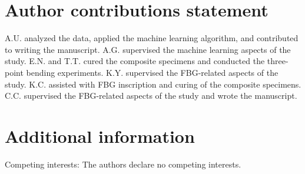 \documentclass[fleqn,10pt]{wlscirep}
\begin{document}
\section*{Author contributions statement}

A.U. analyzed the data, applied the machine learning algorithm, and contributed to writing the manuscript. A.G. supervised the machine learning aspects of the study. E.N. and T.T. cured the composite specimens and conducted the three-point bending experiments. K.Y. supervised the FBG-related aspects of the study. K.C. assisted with FBG inscription and curing of the composite specimens. C.C. supervised the FBG-related aspects of the study and wrote the manuscript.

\section*{Additional information}

Competing interests: The authors declare no competing interests.
\end{document}
